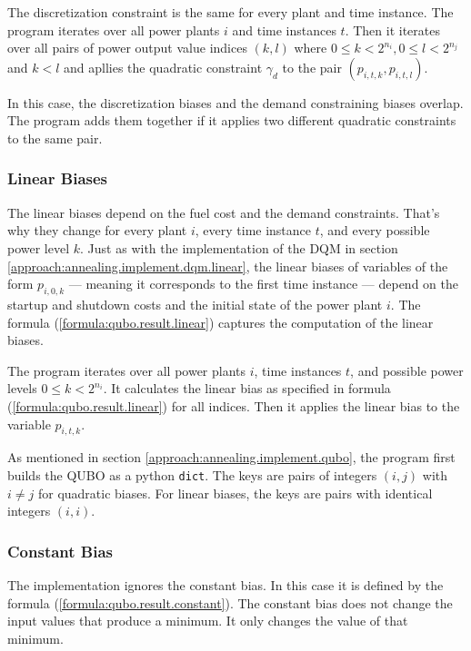 The discretization constraint is the same for every plant and time instance.
The program iterates over all power plants $i$ and time instances $t$.
Then it iterates over all pairs of power output value indices $(k, l)$ where $0 \leq k < 2^{n_i}, 0 \leq l < 2^{n_j}$ and $k < l$ and apllies the quadratic constraint $\gamma_d$ to the pair $(p_{i, t, k}, p_{i, t, l})$.

In this case, the discretization biases and the demand constraining biases overlap.
The program adds them together if it applies two different quadratic constraints to the same pair.

\subsubsection{Linear Biases}
\label{approach:annealing.implement.qubo.linear}

The linear biases depend on the fuel cost and the demand constraints.
That's why they change for every plant $i$, every time instance $t$, and every possible power level $k$.
Just as with the implementation of the DQM in section \ref{approach:annealing.implement.dqm.linear}, the linear biases of variables of the form $p_{i, 0, k}$
--- meaning it corresponds to the first time instance ---
depend on the startup and shutdown costs and the initial state of the power plant $i$.
The formula (\ref{formula:qubo.result.linear}) captures the computation of the linear biases.

The program iterates over all power plants $i$, time instances $t$, and possible power levels $0 \leq k < 2^{n_i}$.
It calculates the linear bias as specified in formula (\ref{formula:qubo.result.linear}) for all indices.
Then it applies the linear bias to the variable $p_{i, t, k}$.

As mentioned in section \ref{approach:annealing.implement.qubo}, the program first builds the QUBO as a python \texttt{dict}.
The keys are pairs of integers $(i, j)$ with $i \neq j$ for quadratic biases.
For linear biases, the keys are pairs with identical integers $(i, i)$.

\subsubsection{Constant Bias}
\label{approach:annealing.implement.qubo.constant}

The implementation ignores the constant bias.
In this case it is defined by the formula (\ref{formula:qubo.result.constant}).
The constant bias does not change the input values that produce a minimum.
It only changes the value of that minimum.
